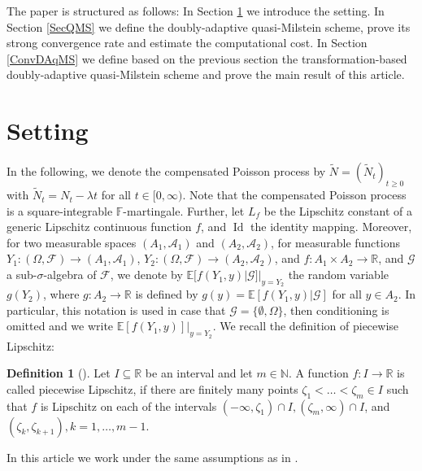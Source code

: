 \documentclass[11pt,a4paper]{article}
\numberwithin{equation}{section}
\theoremstyle{definition}
\newtheorem{definition}[theorem]{Definition}
\newcommand{\E}{{\mathbb{E}}}
\newcommand{\N}{{\mathbb{N}}}
\newcommand{\R}{{\mathbb{R}}}
\begin{document}
The paper is structured as follows: In Section \ref{sec:setting} we introduce the setting. In Section \ref{SecQMS} we define the doubly-adaptive quasi-Milstein scheme, prove its strong convergence rate and estimate the computational cost. In Section \ref{ConvDAqMS} we define based on the previous section the transformation-based doubly-adaptive quasi-Milstein scheme and prove the main result of this article.


\section{Setting}\label{sec:setting}


In the following, we denote the compensated Poisson process by $\tilde N=(\tilde N_t)_{t\geq 0}$ with $\tilde N_t=N_t-\lambda t$ for all $t\in[0,\infty)$. Note that the compensated Poisson process is a square-integrable $\mathbb{F}$-martingale. Further, let  $L_f$ be the Lipschitz constant of a generic Lipschitz continuous function $f$, and $\operatorname{Id}$ the identity mapping.
Moreover, for two measurable spaces $(A_1,\mathcal{A}_1)$ and $(A_2,\mathcal{A}_2)$, for measurable functions $Y_1\colon(\Omega,\mathcal{F})\to (A_1,\mathcal{A}_1)$, $Y_2\colon(\Omega,\mathcal{F})\to (A_2,\mathcal{A}_2)$, and $f\colon A_1\times A_2 \to \R$, and $\mathcal{G}$ a sub-$\sigma$-algebra of $\mathcal{F}$, we denote by $\E[f(Y_1,y)|\mathcal{G}] |_{y=Y_2}$ the random variable $g(Y_2)$, where $g\colon A_2\to\R$ is defined by $g(y)= \E[f(Y_1,y)|\mathcal{G}]$ for all $y\in A_2$. In particular, this notation is used in case that $\mathcal{G} = \{\emptyset, \Omega\}$, then conditioning is omitted and we write $\E[f(Y_1,y)] |_{y=Y_2}$.
We recall the definition of piecewise Lipschitz:

\begin{definition}[]
Let $I\subseteq\R$ be an interval and let $m\in\N$. A function $f\colon I\to\R$
is called piecewise Lipschitz, if there are finitely many points $\zeta_1<\ldots<\zeta_m\in
I$ such that $f$ is Lipschitz on each of the intervals $(-\infty,\zeta_1)\cap I,
(\zeta_m,\infty)\cap I$, and $(\zeta_k,\zeta_{k+1}),k=1,\ldots,m-1$.
\end{definition}

In this article we work under the same assumptions as in \cite{PSS2024JMS}.
\newpage
\end{document}
